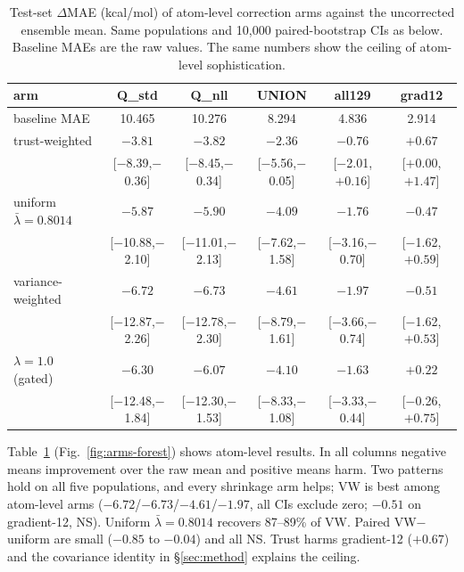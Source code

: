 \documentclass{article}
\begin{document}
\begin{table}[t]
  \caption{Test-set $\Delta$MAE (kcal/mol) of atom-level correction arms
  against the uncorrected ensemble mean. Same populations and 10{,}000
  paired-bootstrap CIs as below. Baseline MAEs are the raw values. The same
  numbers show the ceiling of atom-level sophistication.}
  \label{tab:arms}
  \centering
  \renewcommand{\arraystretch}{1.35}
  \setlength{\tabcolsep}{4pt}
  \small
  \begin{tabular}{@{}l@{\hspace{6pt}}ccccc@{}}
    \toprule
    arm & Q\_std & Q\_nll & UNION & all129 & grad12 \\
    \midrule
    baseline MAE & 10.465 & 10.276 & 8.294 & 4.836 & 2.914 \\
    trust-weighted & $-3.81$ & $-3.82$ & $-2.36$ & $-0.76$ & $+0.67$ \\
    & [$-$8.39,$-$0.36] & [$-$8.45,$-$0.34] & [$-$5.56,$-$0.05] & [$-$2.01,$+0.16$] & [$+0.00$,$+1.47$] \\
    uniform $\bar\lambda{=}0.8014$ & $-5.87$ & $-5.90$ & $-4.09$ & $-1.76$ & $-0.47$ \\
    & [$-$10.88,$-$2.10] & [$-$11.01,$-$2.13] & [$-$7.62,$-$1.58] & [$-$3.16,$-$0.70] & [$-$1.62,$+0.59$] \\
    variance-weighted & $-6.72$ & $-6.73$ & $-4.61$ & $-1.97$ & $-0.51$ \\
    & [$-$12.87,$-$2.26] & [$-$12.78,$-$2.30] & [$-$8.79,$-$1.61] & [$-$3.66,$-$0.74] & [$-$1.62,$+0.53$] \\
    $\lambda{=}1.0$ (gated) & $-6.30$ & $-6.07$ & $-4.10$ & $-1.63$ & $+0.22$ \\
    & [$-$12.48,$-$1.84] & [$-$12.30,$-$1.53] & [$-$8.33,$-$1.08] & [$-$3.33,$-$0.44] & [$-$0.26,$+0.75$] \\
    \bottomrule
  \end{tabular}
\end{table}

Table~\ref{tab:arms} (Fig.~\ref{fig:arms-forest}) shows atom-level results. In all \DeltaMAE columns negative means improvement over the raw mean and positive means harm.
Two patterns hold on all five populations, and every shrinkage arm helps; VW is
best among atom-level arms ($-6.72$/$-6.73$/$-4.61$/$-1.97$, all CIs exclude zero;
$-0.51$ on gradient-12, NS). Uniform $\bar\lambda=0.8014$ recovers 87--89\% of VW.
Paired VW$-$uniform are small ($-0.85$ to $-0.04$) and all NS. Trust harms
gradient-12 ($+0.67$) and the covariance identity in \S\ref{sec:method} explains the ceiling.
\end{document}

